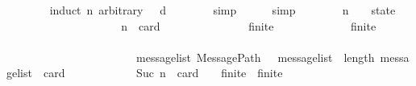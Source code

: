 \begin{isabellebody}
\ \ \ \ \ \ \isamarkupfalse%
\ {\isacharparenleft}induct\ n\ arbitrary{\isacharcolon}\ {\isasymsigma}\ {\isasymsigma}{\isacharprime}\ d{\isacharparenright}\isanewline
\ \ \ \ \ \ \isamarkupfalse%
\ {\isacharparenleft}simp{\isacharparenright}\isanewline
\ \ \ \ \isamarkupfalse%
\ simp\isanewline
\ \ \ \ \ \ \isamarkupfalse%
\ n\ \ {\isasymsigma}\ {\isacharcolon}{\isacharcolon}\ state\ \ {\isasymsigma}{\isacharprime}\isanewline
\ \ \ \ \ \ \isamarkupfalse%
\ {\isachardoublequoteopen}{\isasymAnd}{\isasymsigma}\ {\isasymsigma}{\isacharprime}{\isachardot}\isanewline
\ \ \ \ \ \ \ \ \ \ \ n\ {\isacharequal}\ card\ {\isacharparenleft}{\isasymsigma}{\isacharprime}\ {\isacharminus}\ {\isasymsigma}{\isacharparenright}\ {\isasymLongrightarrow}\isanewline
\ \ \ \ \ \ \ \ \ \ \ finite\ {\isasymsigma}\ {\isasymLongrightarrow}\isanewline
\ \ \ \ \ \ \ \ \ \ \ finite\ {\isasymsigma}{\isacharprime}\ {\isasymLongrightarrow}\isanewline
\ \ \ \ \ \ \ \ \ \ \ {\isasymsigma}\ {\isasymnoteq}\ {\isasymsigma}{\isacharprime}\ {\isasymLongrightarrow}\isanewline
\ \ \ \ \ \ \ \ \ \ \ {\isasymsigma}\ {\isasymin}\ {\isasymSigma}\ {\isasymLongrightarrow}\ {\isasymsigma}{\isacharprime}\ {\isasymin}\ {\isasymSigma}\ {\isasymLongrightarrow}\ {\isasymsigma}\ {\isasymsubseteq}\ {\isasymsigma}{\isacharprime}\ {\isasymLongrightarrow}\ {\isasymexists}message{\isacharunderscore}list{\isachardot}\ MessagePath\ {\isasymsigma}\ {\isasymsigma}{\isacharprime}\ message{\isacharunderscore}list\ {\isasymand}\ length\ message{\isacharunderscore}list\ {\isacharequal}\ card\ {\isacharparenleft}{\isasymsigma}{\isacharprime}\ {\isacharminus}\ {\isasymsigma}{\isacharparenright}{\isachardoublequoteclose}\isanewline
\ \ \ \ \ \ \ \ \ {\isachardoublequoteopen}Suc\ n\ {\isacharequal}\ card\ {\isacharparenleft}{\isasymsigma}{\isacharprime}\ {\isacharminus}\ {\isasymsigma}{\isacharparenright}{\isachardoublequoteclose}\ {\isachardoublequoteopen}finite\ {\isasymsigma}{\isachardoublequoteclose}\ {\isachardoublequoteopen}finite\ {\isasymsigma}{\isacharprime}{\isachardoublequoteclose}\ {\isachardoublequoteopen}{\isasymsigma}\ {\isasymnoteq}\ {\isasymsigma}{\isacharprime}{\isachardoublequoteclose}\ {\isachardoublequoteopen}{\isasymsigma}\ {\isasymin}\ {\isasymSigma}{\isachardoublequoteclose}\ {\isachardoublequoteopen}{\isasymsigma}{\isacharprime}\ {\isasymin}\ {\isasymSigma}{\isachardoublequoteclose}\ {\isachardoublequoteopen}{\isasymsigma}\ {\isasymsubseteq}\ {\isasymsigma}{\isacharprime}{\isachardoublequoteclose}\isanewline

\end{isabellebody}
